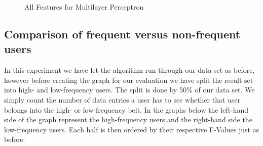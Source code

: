 \begin{figure}[H]
	\caption{All Features for Multilayer Perceptron}
\end{figure}


\newpage
\subsection{Comparison of frequent versus non-frequent users}
In this experiment we have let the algorithm run through our data set as before, however before creating the graph for our evaluation we have split the result set into high- and low-frequency users. The split is done by 50\% of our data set. We simply count the number of data entries a user has to see whether that user belongs into the high- or low-frequency belt. In the graphs below the left-hand side of the graph represent the high-frequency users and the right-hand side the low-frequency users. Each half is then ordered by their respective F-Values just as before.

